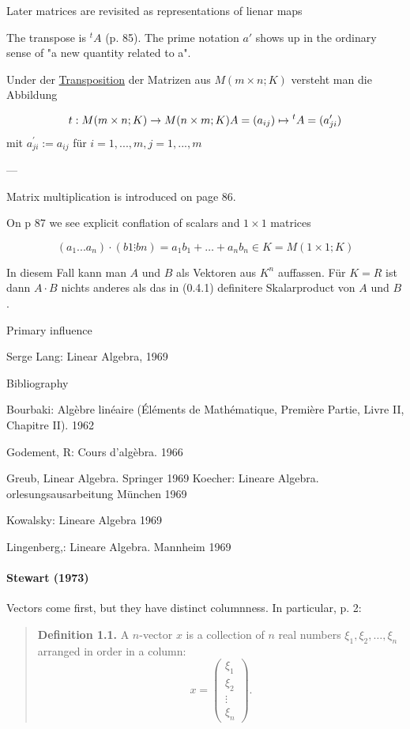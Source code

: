 Later matrices are revisited as representations of lienar maps

The transpose is ${}^t A$ (p. 85). The prime notation $a'$ shows up in the ordinary sense of "a new quantity related to a".

Under der \underline{Transposition} der Matrizen aus $M(m\times n; K)$ versteht man die Abbildung

\[
t: M(m\times n; K) \rightarrow M(n \times m; K) \\
A = (a_{ij}) \mapsto {}^t A = (a^\prime_{ji})
\]
mit $a^\prime_{ji} := a_{ij}$ für $i=1,...,m, j=1,..., m$

---

Matrix multiplication is introduced on page 86.

On p 87 we see explicit conflation of scalars and $1\times1$ matrices

\[
(a_1...a_n) \cdot (b1 \vdots bn) = a_1 b_1 + \dots + a_n b_n \in K = M(1\times 1; K)\]

In diesem Fall kann man $A$ und $B$ als Vektoren aus $K^n$ auffassen. Für $K=R$ ist dann $A\cdot B$ nichts anderes als das in (0.4.1) definitere Skalarproduct von $A$ und $B$.

Primary influence

Serge Lang: Linear Algebra, 1969

Bibliography

Bourbaki: Algèbre linéaire (Éléments de Mathématique, Première Partie, Livre II, Chapitre II). 1962

Godement, R: Cours d'algèbra. 1966

Greub, Linear Algebra. Springer 1969
Koecher: Lineare Algebra. orlesungsausarbeitung München 1969

Kowalsky: Lineare Algebra 1969

Lingenberg,: Lineare Algebra. Mannheim 1969


\paragraph{Stewart (1973)~\cite{Stewart1973}}

Vectors come first, but they have distinct columnness. In particular, p. 2:

\begin{quote}
    \textbf{Definition 1.1.} A $n$-vector $x$ is a collection of $n$ real numbers
    $\xi_1, \xi_2, \dots, \xi_n$ arranged in order in a column:
    \[
        x = \begin{pmatrix}\xi_1\\\xi_2\\\vdots\\\xi_n\end{pmatrix}.
    \]
\end{quote}

